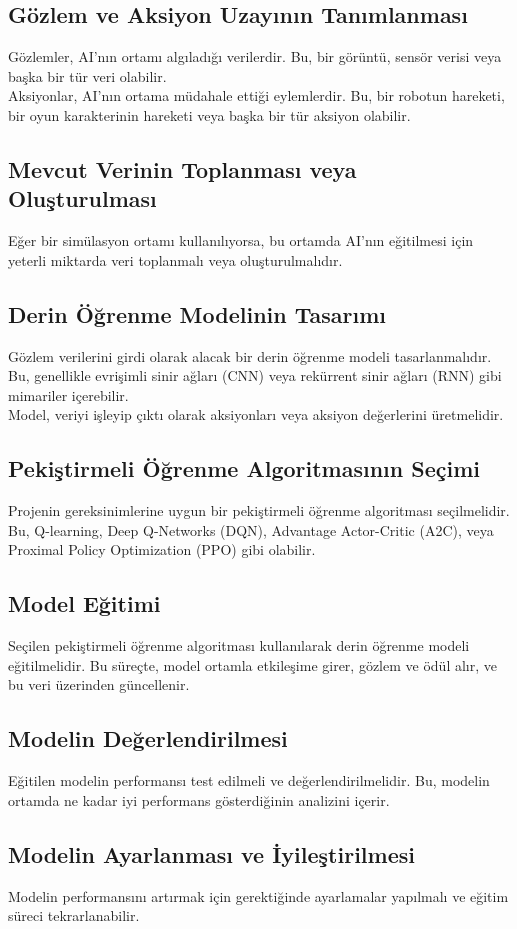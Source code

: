 \documentclass{article}
\begin{document}
\subsection{Gözlem ve Aksiyon Uzayının Tanımlanması}
Gözlemler, AI'nın ortamı algıladığı verilerdir. Bu, bir görüntü, sensör verisi veya başka bir tür veri olabilir.
\\[15pt]
Aksiyonlar, AI'nın ortama müdahale ettiği eylemlerdir. Bu, bir robotun hareketi, bir oyun karakterinin hareketi veya başka bir tür aksiyon olabilir.
\subsection{Mevcut Verinin Toplanması veya Oluşturulması}
Eğer bir simülasyon ortamı kullanılıyorsa, bu ortamda AI'nın eğitilmesi için yeterli miktarda veri toplanmalı veya oluşturulmalıdır.
\subsection{Derin Öğrenme Modelinin Tasarımı}
Gözlem verilerini girdi olarak alacak bir derin öğrenme modeli tasarlanmalıdır. Bu, genellikle evrişimli sinir ağları (CNN) veya rekürrent sinir ağları (RNN) gibi mimariler içerebilir.
\\[15pt]
Model, veriyi işleyip çıktı olarak aksiyonları veya aksiyon değerlerini üretmelidir.
\subsection{Pekiştirmeli Öğrenme Algoritmasının Seçimi}
Projenin gereksinimlerine uygun bir pekiştirmeli öğrenme algoritması seçilmelidir. Bu, Q-learning, Deep Q-Networks (DQN), Advantage Actor-Critic (A2C), veya Proximal Policy Optimization (PPO) gibi olabilir.
\subsection{Model Eğitimi}
Seçilen pekiştirmeli öğrenme algoritması kullanılarak derin öğrenme modeli eğitilmelidir. Bu süreçte, model ortamla etkileşime girer, gözlem ve ödül alır, ve bu veri üzerinden güncellenir.
\subsection{Modelin Değerlendirilmesi}
Eğitilen modelin performansı test edilmeli ve değerlendirilmelidir. Bu, modelin ortamda ne kadar iyi performans gösterdiğinin analizini içerir.
\subsection{Modelin Ayarlanması ve İyileştirilmesi}
Modelin performansını artırmak için gerektiğinde ayarlamalar yapılmalı ve eğitim süreci tekrarlanabilir.
\end{document}

